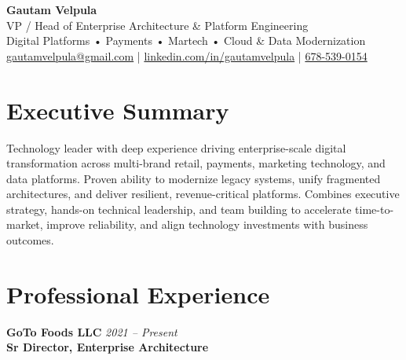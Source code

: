 \documentclass[11pt]{article}
\begin{document}
\begin{center}
    {\LARGE \textbf{Gautam Velpula}} \\[4pt]
    VP / Head of Enterprise Architecture \& Platform Engineering \\[6pt]
    Digital Platforms • Payments • Martech • Cloud \& Data Modernization \\[6pt]
    \href{mailto:gautamvelpula@gmail.com}{gautamvelpula@gmail.com} \;|\;
    \href{https://www.linkedin.com/in/gautamvelpula}{linkedin.com/in/gautamvelpula} \;|\; 
    \href{tel:6785390154}{678-539-0154}
  \end{center}

\vspace{8pt}

\section*{Executive Summary}
Technology leader with deep experience driving enterprise-scale digital transformation across multi-brand retail, payments, marketing technology, and data platforms. Proven ability to modernize legacy systems, unify fragmented architectures, and deliver resilient, revenue-critical platforms. Combines executive strategy, hands-on technical leadership, and team building to accelerate time-to-market, improve reliability, and align technology investments with business outcomes.

\section*{Professional Experience}

\textbf{GoTo Foods LLC} \hfill \textit{2021 -- Present} \\
\textbf{Sr Director, Enterprise Architecture}
\end{document}
